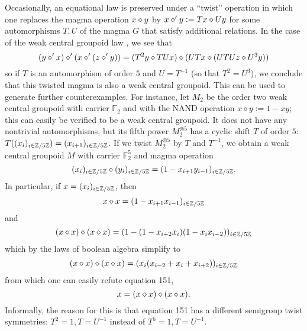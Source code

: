 Occasionally, an equational law is preserved under a ``twist'' operation in which one replaces the magma operation $x \diamond y$ by $x \diamond' y := Tx \diamond Uy$ for some automorphisms $T,U$ of the magma $G$ that satisfy additional relations.  In the case of the weak central groupoid law , we see that
$$
(y \diamond' x) \diamond' (x \diamond' (z \diamond' y))= (T^2 y \diamond TUx) \diamond (UTx \diamond (UTUz \diamond U^3y))$$
so if $T$ is an automorphism of order $5$ and $U = T^{-1}$ (so that $T^2 = U^3$), we conclude that this twisted magma is also a weak central groupoid.  This can be used to generate further counterexamples.  For instance, let $M_2$ be the order two weak central groupoid with carrier ${\mathbb F}_2$ and with the NAND operation $x \diamond y := 1 - xy$; this can easily be verified to be a weak central groupoid.  It does not have any nontrivial automorphisms, but its fifth power $M_2^{\otimes 5}$ has a cyclic shift $T$ of order $5$: $T( (x_i)_{i\in \mathbb{Z}/5\mathbb{Z}} ) = (x_{i+1})_{i \in \mathbb{Z}/5\mathbb{Z}}$.  If we twist $M_2^{\otimes 5}$ by $T$ and $T^{-1}$, we obtain a weak central groupoid $M$ with carrier ${\mathbb F}_2^5$ and magma operation
$$(x_i)_{i\in \mathbb{Z}/5\mathbb{Z}} \diamond (y_i)_{i\in \mathbb{Z}/5\mathbb{Z}} = (1 - x_{i+1} y_{i-1})_{i \in \mathbb{Z}/5\mathbb{Z}}.$$
In particular, if $x = (x_i)_{i\in \mathbb{Z}/5\mathbb{Z}}$, then
$$ x \diamond x = (1 - x_{i+1} x_{i-1})_{i \in \mathbb{Z}/5\mathbb{Z}}$$
and
$$ (x \diamond x) \diamond (x \diamond x) = (1 - (1 - x_{i+2} x_{i}) (1 - x_i x_{i-2}) )_{i \in \mathbb{Z}/5\mathbb{Z}}$$
which by the laws of boolean algebra simplify to
$$ (x \diamond x) \diamond (x \diamond x) = (x_i (x_{i-2} + x_i + x_{i+2}))_{i \in \mathbb{Z}/5\mathbb{Z}}$$
from which one can easily refute equation 151,
$$ x = (x \diamond x) \diamond (x \diamond x).$$
Informally, the reason for this is that equation 151 has a different semigroup twist symmetries: $T^2 = 1, T = U^{-1}$ instead of $T^5 = 1, T = U^{-1}$.
